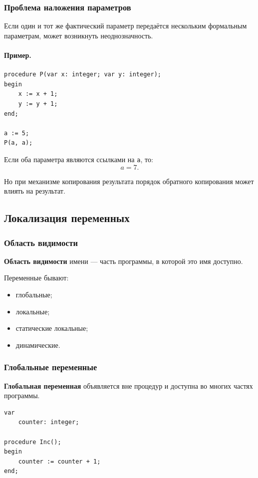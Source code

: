 \documentclass[12pt,a4paper]{article}
\begin{document}
\subsubsection{Проблема наложения параметров}

Если один и тот же фактический параметр передаётся нескольким формальным параметрам, может возникнуть неоднозначность.

\paragraph{Пример.}

\begin{verbatim}
procedure P(var x: integer; var y: integer);
begin
    x := x + 1;
    y := y + 1;
end;

a := 5;
P(a, a);
\end{verbatim}

Если оба параметра являются ссылками на \texttt{a}, то:
\[
    a = 7.
\]

Но при механизме копирования результата порядок обратного копирования может влиять на результат.

\subsection{Локализация переменных}

\subsubsection{Область видимости}

\textbf{Область видимости} имени --- часть программы, в которой это имя доступно.

Переменные бывают:
\begin{itemize}
    \item глобальные;
    \item локальные;
    \item статические локальные;
    \item динамические.
\end{itemize}

\subsubsection{Глобальные переменные}

\textbf{Глобальная переменная} объявляется вне процедур и доступна во многих частях программы.

\begin{verbatim}
var
    counter: integer;

procedure Inc();
begin
    counter := counter + 1;
end;
\end{verbatim}
\end{document}
